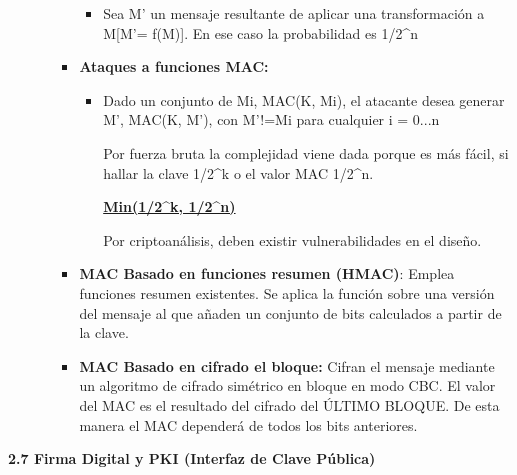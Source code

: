 \documentclass[12pt, twoside, openright]{report} %
\begin{document}
\begin{itemize}
\begin{itemize}
\begin{itemize}
\begin{itemize}
        \item Sea M' un mensaje resultante de aplicar una transformación a
          M{[}M'= f(M){]}. En ese caso la probabilidad es 1/2\^{}n
          
        \end{itemize}
      \item \textbf{Ataques a funciones MAC:}
        

        \begin{itemize}
        \item Dado un conjunto de Mi, MAC(K, Mi), el atacante desea generar
          M', MAC(K, M'), con M'!=Mi para cualquier i = 0...n
          

          
		  
            Por fuerza bruta la complejidad viene dada porque es más
            fácil, si hallar la clave 1/2\^{}k o el valor MAC 1/2\^{}n.
          
			
            \textbf{\underline{Min(1/2\^{}k, 1/2\^{}n)}}
         
			
            Por criptoanálisis, deben existir vulnerabilidades en el
            diseño.
 
			
        \end{itemize}
      \item \textbf{MAC Basado en funciones resumen (HMAC)}: Emplea
        funciones resumen existentes. Se aplica la función sobre una
        versión del mensaje al que añaden un conjunto de bits calculados
        a partir de la clave.
        
      \item \textbf{MAC Basado en cifrado el bloque:} Cifran el mensaje
        mediante un algoritmo de cifrado simétrico en bloque en modo
        CBC. El valor del MAC es el resultado del cifrado del ÚLTIMO
        BLOQUE. De esta manera el MAC dependerá de todos los bits
        anteriores.
        
      \end{itemize}
    \end{itemize}
  \end{itemize}

  
  \textbf{2.7 Firma Digital y PKI (Interfaz de Clave Pública)}
  
\end{document}
